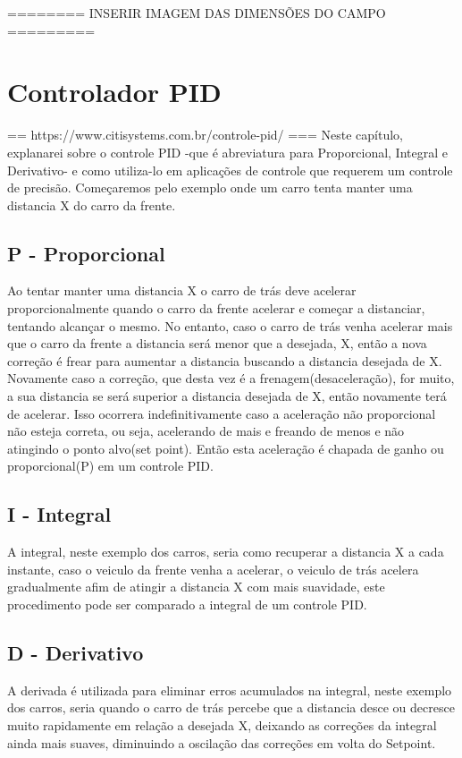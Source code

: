 \documentclass[a4paper,12pt,portuguese]{ufms-cpcx}
\begin{document}
======== INSERIR IMAGEM DAS DIMENSÕES DO CAMPO =========


\chapter{Controlador PID}
== https://www.citisystems.com.br/controle-pid/ ===
Neste capítulo, explanarei sobre o controle PID -que é abreviatura para Proporcional, Integral e Derivativo- e como utiliza-lo em aplicações de controle que requerem um controle de precisão. Começaremos pelo exemplo onde um carro tenta manter uma distancia X do carro da frente.

\section{P - Proporcional}
Ao tentar manter uma distancia X o carro de trás deve acelerar proporcionalmente quando o carro da frente acelerar e começar a distanciar, tentando alcançar o mesmo. No entanto, caso o carro de trás venha acelerar mais que o carro da frente a distancia será menor que a desejada, X, então a nova correção é frear para aumentar a distancia buscando a distancia desejada de X. Novamente caso a correção, que desta vez é a frenagem(desaceleração), for muito, a sua distancia se será superior a distancia desejada de X, então novamente terá de acelerar. Isso ocorrera indefinitivamente caso a aceleração não proporcional não esteja correta, ou seja, acelerando de mais e freando de menos e não atingindo o ponto alvo(set point). Então esta aceleração é chapada de ganho ou proporcional(P) em um controle PID.

\section{I - Integral}
A integral, neste exemplo dos carros, seria como recuperar a distancia X a cada instante, caso o veiculo da frente venha a acelerar, o veiculo de trás acelera gradualmente afim de atingir a distancia X com mais suavidade, este procedimento pode ser comparado a integral de um controle PID.

\section{D - Derivativo}
A derivada é utilizada para eliminar erros acumulados na integral, neste exemplo dos carros, seria quando o carro de trás percebe que a distancia desce ou decresce muito rapidamente em relação a desejada X, deixando as correções da integral ainda mais suaves, diminuindo a oscilação das correções em volta do Setpoint.
\end{document}
